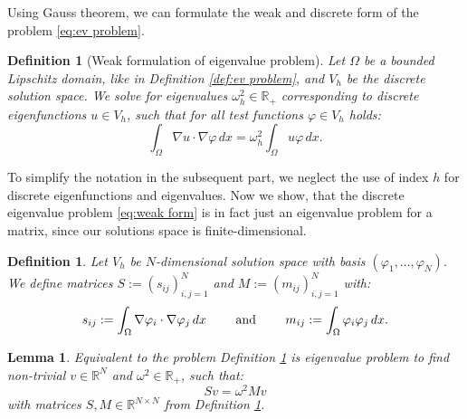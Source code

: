 \documentclass[a4paper,11pt,bibliography=totoc,listof=totoc,headinclude=true,cleardoublepage=empty,oneside]{scrbook}
\newtheorem{definition}[theorem]{Definition}
\newtheorem{lemma}[theorem]{Lemma}
\newcommand{\R}{\mathbb{R}}
\begin{document}
Using Gauss theorem, we can formulate the weak and discrete form of the problem \eqref{eq:ev problem}.
\begin{definition}[Weak formulation of eigenvalue problem]\label{def:weak form}
    Let $\Omega$ be a bounded Lipschitz domain, like in Definition \ref{def:ev problem}, and $V_h$ be the discrete solution space. We solve for eigenvalues $\omega_h^2 \in \R_+$ corresponding to discrete eigenfunctions $u \in V_h$, such that for all test functions $\varphi \in V_h$ holds:
    \begin{equation}\label{eq:weak form}
        \int_\Omega \nabla u \cdot \nabla \varphi \, dx = \omega_h^2 \int_\Omega u \varphi \, dx.
    \end{equation}  
\end{definition}
To simplify the notation in the subsequent part, we neglect the use of index $h$ for discrete eigenfunctions and eigenvalues. Now we show, that the discrete eigenvalue problem \eqref{eq:weak form} is in fact just an eigenvalue problem for a matrix, since our solutions space is finite-dimensional. 
\begin{definition}\label{def:SM matrices}
    Let $V_h$ be $N$-dimensional solution space with basis $(\varphi_1, \dots, \varphi_N)$. We define matrices $S:=(s_{ij})_{i, j=1}^N $ and $M:=(m_{ij})_{i, j=1}^N $ with:
    \begin{equation*}
        s_{ij} := \int_\Omega \nabla \varphi_i \cdot \nabla \varphi_j \, dx \hspace{.7cm} \text{ and } \hspace{.7cm} m_{ij} := \int_\Omega \varphi_i \varphi_j \, dx.
    \end{equation*}
\end{definition}
\begin{lemma}
    Equivalent to the problem Definition \ref{def:weak form} is eigenvalue problem to find non-trivial $v \in \R^N$ and $\omega^2 \in \R_+$, such that:
    \begin{equation}\label{eq:matrix form}
        Sv = \omega^2 Mv
    \end{equation}
    with matrices $S, M \in \R^{N \times N}$ from Definition \ref{def:SM matrices}.
\end{lemma}
\end{document}
